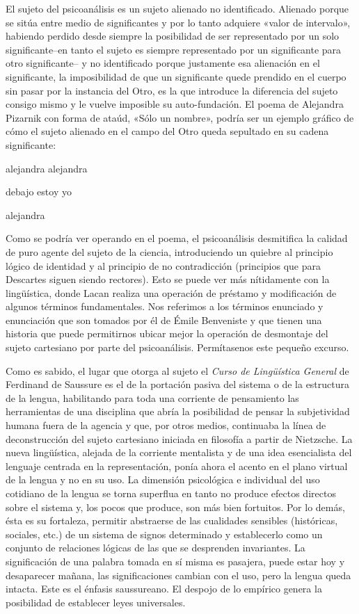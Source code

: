 El sujeto del psicoanálisis es un sujeto alienado no identificado. Alienado porque se sitúa entre medio de significantes y por lo tanto adquiere «valor de intervalo», habiendo perdido desde siempre la posibilidad de ser representado por un solo significante--en tanto el sujeto es siempre representado por un significante para otro significante-- y no identificado porque justamente esa alienación en el significante, la imposibilidad de que un significante quede prendido en el cuerpo sin pasar por la instancia del Otro, es la que introduce la diferencia del sujeto consigo mismo y le vuelve imposible su auto-fundación. El poema de Alejandra Pizarnik con forma de ataúd, «Sólo un nombre», podría ser un ejemplo gráfico de cómo el sujeto alienado en el campo del Otro queda sepultado en su cadena significante:

alejandra alejandra

debajo estoy yo

alejandra

Como se podría ver operando en el poema, el psicoanálisis desmitifica la calidad de puro agente del sujeto de la ciencia, introduciendo un quiebre al principio lógico de identidad y al principio de no contradicción (principios que para Descartes siguen siendo rectores). Esto se puede ver más nítidamente con la lingüística, donde Lacan realiza una operación de préstamo y modificación de algunos términos fundamentales. Nos referimos a los términos enunciado y enunciación que son tomados por él de Émile Benveniste y que tienen una historia que puede permitirnos ubicar mejor la operación de desmontaje del sujeto cartesiano por parte del psicoanálisis. Permítasenos este pequeño excurso.

Como es sabido, el lugar que otorga al sujeto el \emph{Curso de Lingüística General} de Ferdinand de Saussure es el de la portación pasiva del sistema o de la estructura de la lengua, habilitando para toda una corriente de pensamiento las herramientas de una disciplina que abría la posibilidad de pensar la subjetividad humana fuera de la agencia y que, por otros medios, continuaba la línea de deconstrucción del sujeto cartesiano iniciada en filosofía a partir de Nietzsche. La nueva lingüística, alejada de la corriente mentalista y de una idea esencialista del lenguaje centrada en la representación, ponía ahora el acento en el plano virtual de la lengua y no en su uso. La dimensión psicológica e individual del uso cotidiano de la lengua se torna superflua en tanto no produce efectos directos sobre el sistema y, los pocos que produce, son más bien fortuitos. Por lo demás, ésta es su fortaleza, permitir abstraerse de las cualidades sensibles (históricas, sociales, etc.) de un sistema de signos determinado y establecerlo como un conjunto de relaciones lógicas de las que se desprenden invariantes. La significación de una palabra tomada en sí misma es pasajera, puede estar hoy y desaparecer mañana, las significaciones cambian con el uso, pero la lengua queda intacta. Este es el énfasis saussureano. El despojo de lo empírico genera la posibilidad de establecer leyes universales.

